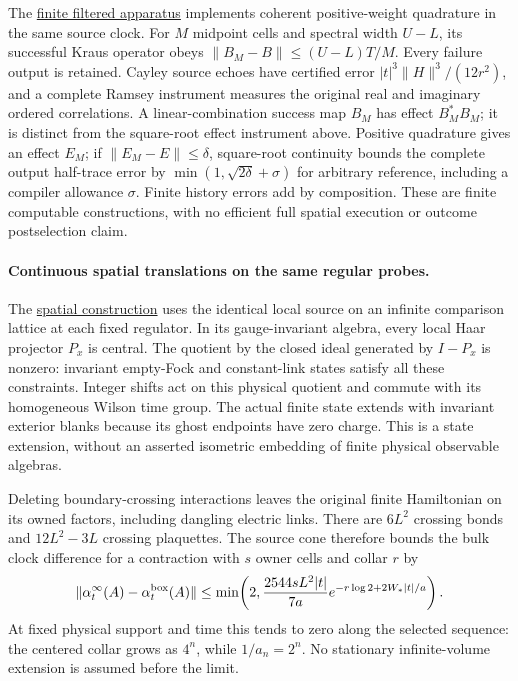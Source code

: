 The \href{https://github.com/FloatingPragma/observer-patch-holography/blob/main/model/particle_filtered_probe/PROOF.md}{finite filtered apparatus}
implements coherent positive-weight quadrature in the same source clock.
For $M$ midpoint cells and spectral width $U-L$, its successful Kraus
operator obeys $\|B_M-B\|\le(U-L)T/M$. Every failure output is retained.
Cayley source echoes have certified error
$|t|^3\|H\|^3/(12r^2)$, and a complete Ramsey instrument measures the
original real and imaginary ordered correlations. A linear-combination
success map $B_M$ has effect $B_M^*B_M$; it is distinct from the
square-root effect instrument above. Positive quadrature gives an effect
$E_M$; if $\|E_M-E\|\le\delta$, square-root continuity bounds the
complete output half-trace error by
$\min(1,\sqrt{2\delta}+\sigma)$ for arbitrary reference, including a
compiler allowance $\sigma$. Finite history errors add by composition.
These are finite computable constructions, with no efficient full spatial
execution or outcome postselection claim.

\paragraph{Continuous spatial translations on the same regular probes.}
The \href{https://github.com/FloatingPragma/observer-patch-holography/blob/main/model/particle_primary_spatial_algebra/PROOF.md}{spatial construction}
uses the identical local source on an infinite comparison lattice at each
fixed regulator. In its gauge-invariant algebra, every local Haar
projector $P_x$ is central. The quotient by the closed ideal generated by
$I-P_x$ is nonzero: invariant empty-Fock and constant-link states satisfy
all these constraints. Integer shifts act on this physical quotient and
commute with its homogeneous Wilson time group. The actual finite state
extends with invariant exterior blanks because its ghost endpoints have
zero charge. This is a state extension, without an asserted isometric
embedding of finite physical observable algebras.

Deleting boundary-crossing interactions leaves the original finite
Hamiltonian on its owned factors, including dangling electric links.
There are $6L^2$ crossing bonds and $12L^2-3L$ crossing plaquettes. The
source cone therefore bounds the bulk clock difference for a contraction
with $s$ owner cells and collar $r$ by
\[
 \|\alpha_t^{\infty}(A)-\alpha_t^{\rm box}(A)\|
 \le \min\!\left(2,\frac{2544sL^2|t|}{7a}
       e^{-r\log2+2W_*|t|/a}\right).
\]
At fixed physical support and time this tends to zero along the selected
sequence: the centered collar grows as $4^n$, while $1/a_n=2^n$.
No stationary infinite-volume extension is assumed before the limit.

